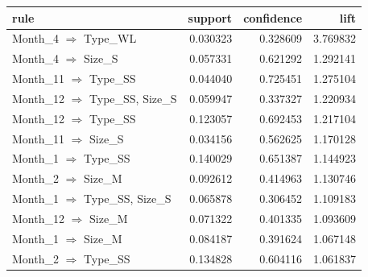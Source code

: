 \begin{tabular}{lrrr}
\toprule
rule & support & confidence & lift \\
\midrule
Month\_4 $\Rightarrow$ Type\_WL & 0.030323 & 0.328609 & 3.769832 \\
Month\_4 $\Rightarrow$ Size\_S & 0.057331 & 0.621292 & 1.292141 \\
Month\_11 $\Rightarrow$ Type\_SS & 0.044040 & 0.725451 & 1.275104 \\
Month\_12 $\Rightarrow$ Type\_SS, Size\_S & 0.059947 & 0.337327 & 1.220934 \\
Month\_12 $\Rightarrow$ Type\_SS & 0.123057 & 0.692453 & 1.217104 \\
Month\_11 $\Rightarrow$ Size\_S & 0.034156 & 0.562625 & 1.170128 \\
Month\_1 $\Rightarrow$ Type\_SS & 0.140029 & 0.651387 & 1.144923 \\
Month\_2 $\Rightarrow$ Size\_M & 0.092612 & 0.414963 & 1.130746 \\
Month\_1 $\Rightarrow$ Type\_SS, Size\_S & 0.065878 & 0.306452 & 1.109183 \\
Month\_12 $\Rightarrow$ Size\_M & 0.071322 & 0.401335 & 1.093609 \\
Month\_1 $\Rightarrow$ Size\_M & 0.084187 & 0.391624 & 1.067148 \\
Month\_2 $\Rightarrow$ Type\_SS & 0.134828 & 0.604116 & 1.061837 \\
\bottomrule
\end{tabular}
